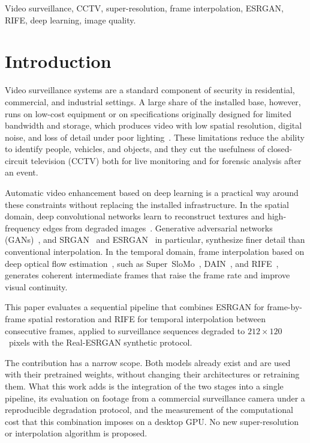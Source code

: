 \documentclass[conference]{IEEEtran}
\begin{document}
\begin{IEEEkeywords}
Video surveillance, CCTV, super-resolution, frame interpolation, ESRGAN, RIFE, deep learning, image quality.
\end{IEEEkeywords}

\section{Introduction}

Video surveillance systems are a standard component of security in residential, commercial, and industrial settings. A large share of the installed base, however, runs on low-cost equipment or on specifications originally designed for limited bandwidth and storage, which produces video with low spatial resolution, digital noise, and loss of detail under poor lighting~\cite{li2011people}. These limitations reduce the ability to identify people, vehicles, and objects, and they cut the usefulness of closed-circuit television (CCTV) both for live monitoring and for forensic analysis after an event.

Automatic video enhancement based on deep learning is a practical way around these constraints without replacing the installed infrastructure. In the spatial domain, deep convolutional networks learn to reconstruct textures and high-frequency edges from degraded images~\cite{dong2014srcnn, vanouwerkerk2006survey}. Generative adversarial networks (GANs)~\cite{goodfellow2014gan}, and SRGAN~\cite{ledig2017srgan} and ESRGAN~\cite{wang2018esrgan} in particular, synthesize finer detail than conventional interpolation. In the temporal domain, frame interpolation based on deep optical flow estimation~\cite{dosovitskiy2015flownet}, such as Super~SloMo~\cite{jiang2018superslomo}, DAIN~\cite{bao2019dain}, and RIFE~\cite{huang2022rife}, generates coherent intermediate frames that raise the frame rate and improve visual continuity.

This paper evaluates a sequential pipeline that combines ESRGAN for frame-by-frame spatial restoration and RIFE for temporal interpolation between consecutive frames, applied to surveillance sequences degraded to $212\times120$~pixels with the Real-ESRGAN synthetic protocol.

The contribution has a narrow scope. Both models already exist and are used with their pretrained weights, without changing their architectures or retraining them. What this work adds is the integration of the two stages into a single pipeline, its evaluation on footage from a commercial surveillance camera under a reproducible degradation protocol, and the measurement of the computational cost that this combination imposes on a desktop GPU. No new super-resolution or interpolation algorithm is proposed.
\end{document}

